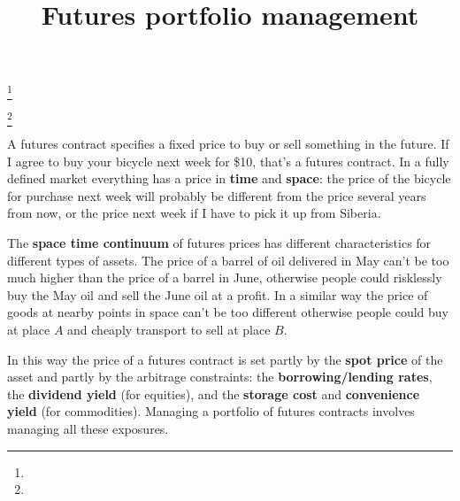 \documentclass{tran-l}
\theoremstyle{definition}
\theoremstyle{remark}
\numberwithin{equation}{subsection}
\begin{document}
\title[]
{Futures portfolio management}

\author{}

\address{}

\email{}

\thanks{}

\thanks{}

\subjclass{}

\keywords{}

\date{}

\dedicatory{}

\commby{}



\maketitle



A futures contract specifies a fixed price to buy or sell something in the future. If I agree to buy your bicycle next week for \$10, that's a futures contract. In a fully defined market everything has a price in \textbf{time} and \textbf{space}: the price of the bicycle for purchase next week will probably be different from the price several years from now, or the price next week if I have to pick it up from Siberia. 

The \textbf{space time continuum} of futures prices has different characteristics for different types of assets. The price of a barrel of oil delivered in May can't be too much higher than the price of a barrel in June, otherwise people could risklessly buy the May oil and sell the June oil at a profit. In a similar way the price of goods at nearby points in space can't be too different otherwise people could buy at place $A$ and cheaply transport to sell at place $B$.  

In this way the price of a futures contract is set partly by the \textbf{spot price} of the asset and partly by the arbitrage constraints: the \textbf{borrowing/lending rates}, the \textbf{dividend yield} (for equities), and the \textbf{storage cost} and \textbf{convenience yield}  (for commodities). Managing a portfolio of futures contracts involves managing all these exposures. 

\end{document}

